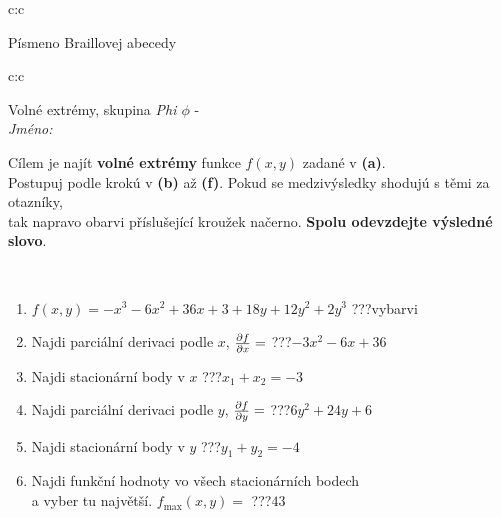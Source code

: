 \documentclass[10pt]{report}
\begin{document}
\begin{tabular}{c:c}
\begin{minipage}[c][104.5mm][t]{0.5\linewidth}
\begin{center}
\begin{minipage}{0.20\linewidth}
\begin{center}
{\small Písmeno Braillovej abecedy}
\end{center}
\end{minipage}
\end{center}
\end{minipage}
%
\end{tabular}
\newpage
\thispagestyle{empty}
\begin{tabular}{c:c}
\begin{minipage}[c][104.5mm][t]{0.5\linewidth}
\begin{center}
\vspace{7mm}
{\huge Volné extrémy, skupina \textit{Phi $\phi$} -}\\[5mm]
\textit{Jméno:}\phantom{xxxxxxxxxxxxxxxxxxxxxxxxxxxxxxxxxxxxxxxxxxxxxxxxxxxxxxxxxxxxxxxxx}\\[5mm]
\begin{minipage}{0.95\linewidth}
\begin{center}
Cílem je najít \textbf{volné extrémy} funkce $f(x,y)$ zadané v \textbf{(a)}.\\Postupuj podle krokú v \textbf{(b)} až \textbf{(f)}. Pokud se medzivýsledky shodujú s těmi za otazníky,\\tak napravo obarvi příslušející kroužek načerno. \textbf{Spolu odevzdejte výsledné slovo}.
\end{center}
\end{minipage}
\\[1mm]
\begin{minipage}{0.79\linewidth}
\begin{center}
\begin{varwidth}{\linewidth}
\begin{enumerate}
\normalsize
\item $f(x,y)=-x^3-6x^2+36x+3+18y+12y^2+2y^3$\quad \dotfill\; ???\;\dotfill \quad vybarvi
\item Najdi parciální derivaci podle $x$, $\pdv{f}{x}=$\quad \dotfill\; ???\;\dotfill \quad $-3x^2-6x+36$
\item Najdi stacionární body v $x$\quad \dotfill\; ???\;\dotfill \quad $x_1+x_2=-3$
\item Najdi parciální derivaci podle $y$, $\pdv{f}{y}=$\quad \dotfill\; ???\;\dotfill \quad $6y^2+24y+6$
\item Najdi stacionární body v $y$\quad \dotfill\; ???\;\dotfill \quad $y_1+y_2=-4$
\item Najdi funkční hodnoty vo všech stacionárních bodech \\ \phantom{xxxxxx} a vyber tu najvětší. $f_{\text{max}}(x,y)=$\quad \dotfill\; ???\;\dotfill \quad $43$

\end{enumerate}
\end{varwidth}
\end{center}
\end{minipage}
\end{center}
\end{minipage}
\end{tabular}
\end{document}

